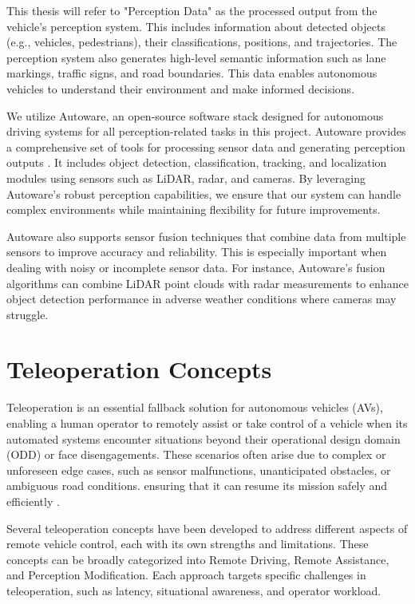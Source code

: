 This thesis will refer to "Perception Data" as the processed output from the vehicle's perception system. This includes information about detected objects (e.g., vehicles, pedestrians), their classifications, positions, and trajectories. The perception system also generates high-level semantic information such as lane markings, traffic signs, and road boundaries. This data enables autonomous vehicles to understand their environment and make informed decisions.

We utilize Autoware, an open-source software stack designed for autonomous driving systems for all perception-related tasks in this project. Autoware provides a comprehensive set of tools for processing sensor data and generating perception outputs \cite{kato2018autoware}. It includes object detection, classification, tracking, and localization modules using sensors such as LiDAR, radar, and cameras. By leveraging Autoware's robust perception capabilities, we ensure that our system can handle complex environments while maintaining flexibility for future improvements.

Autoware also supports sensor fusion techniques that combine data from multiple sensors to improve accuracy and reliability. This is especially important when dealing with noisy or incomplete sensor data. For instance, Autoware's fusion algorithms can combine LiDAR point clouds with radar measurements to enhance object detection
performance in adverse weather conditions where cameras may struggle.
\section{Teleoperation Concepts}

Teleoperation is an essential fallback solution for autonomous vehicles (AVs),
enabling a human operator to remotely assist or take control of a vehicle when
its automated systems encounter situations beyond their operational design domain (ODD)
or face disengagements. These scenarios often arise due to complex or unforeseen edge cases,
such as sensor malfunctions, unanticipated obstacles, or ambiguous road conditions.
ensuring that it can resume its mission safely and efficiently \cite{Brecht}.

Several teleoperation concepts have been developed to address different aspects of remote vehicle control, each with its own strengths and limitations. These concepts can be broadly categorized into Remote Driving, Remote Assistance, and Perception Modification. Each approach targets specific challenges in teleoperation, such as latency, situational awareness, and operator workload.

